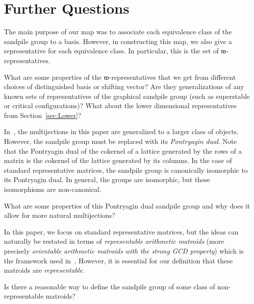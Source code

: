 \documentclass[ALCO,ThmDefs,Unicode,epreuves]{cedram}
\newcommand{\w}{\mathfrak w}
\begin{document}
\section{Further Questions}\label{sec:quest}

The main purpose of our map was to associate each equivalence class of the sandpile group to a basis. However, in constructing this map, we also give a representative for each equivalence class. In particular, this is the set of $\w$-representatives. 


\begin{question}
What are some properties of the $\w$-representatives that we get from different choices of distinguished basis or shifting vector? Are they generalizations of any known sets of representatives of the graphical sandpile group (such as superstable or critical configurations)? What about the lower dimensional representatives from Section~\ref{sec:Lower}?
\end{question}

In~\cite[Chapter~9]{mythesis}, the multijections in this paper are generalized to a larger class of objects. However, the sandpile group must be replaced with its \emph{Pontryagin dual}. Note that the Pontryagin dual of the cokernel of a lattice generated by the rows of a matrix is the cokernel of the lattice generated by its columns. In the case of standard representative matrices, the sandpile group is canonically isomorphic to its Pontryagin dual. In general, the groups are isomorphic, but these isomorphisms are non-canonical. 

\begin{question}\label{q:canonlattice}
What are some properties of this Pontryagin dual sandpile group and why does it allow for more natural multijections?
\end{question}

In this paper, we focus on standard representative matrices, but the ideas can naturally be restated in terms of \emph{representable arithmetic matroids} (more precisely \emph{orientable arithmetic matroids with the strong GCD property}) which is the framework used in~\cite{mythesis}. However, it is essential for our definition that these matroids are \emph{representable}.
\begin{question}
Is there a reasonable way to define the sandpile group of some class of non-representable matroids?
\end{question}




\end{document}

